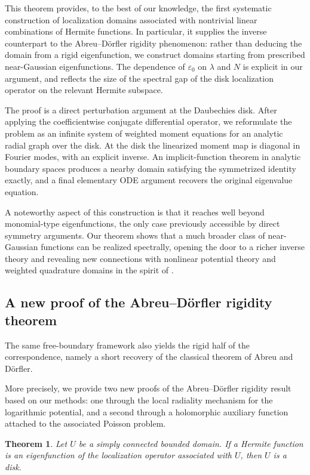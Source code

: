 \documentclass[a4paper,11pt,reqno]{amsart}
\numberwithin{equation}{section}
\theoremstyle{plain} %
\newtheorem{theorem}{Theorem}
\theoremstyle{definition} %
\theoremstyle{remark}
\begin{document}
This theorem provides, to the best of our knowledge, the first systematic construction of localization domains associated with nontrivial linear combinations of Hermite functions. In particular, it supplies the inverse counterpart to the Abreu--D\"orfler rigidity phenomenon: rather than deducing the domain from a rigid eigenfunction, we construct domains starting from prescribed near-Gaussian eigenfunctions. The dependence of $\varepsilon_0$ on $\lambda$ and $N$ is explicit in our argument, and reflects the size of the spectral gap of the disk localization operator on the relevant Hermite subspace.

The proof is a direct perturbation argument at the Daubechies disk. After
applying the coefficientwise conjugate differential operator, we reformulate
the problem as an infinite system of weighted moment equations for an analytic
radial graph over the disk. At the disk the linearized moment map is diagonal
in Fourier modes, with an explicit inverse. An implicit-function theorem in
analytic boundary spaces produces a nearby domain satisfying the symmetrized
identity exactly, and a final elementary ODE argument recovers the original
eigenvalue equation.

A noteworthy aspect of this construction is that it reaches well beyond monomial-type eigenfunctions, the only case previously accessible by direct symmetry arguments. Our theorem shows that a much broader class of near-Gaussian functions can be realized spectrally, opening the door to a richer inverse theory and revealing new connections with nonlinear potential theory and weighted quadrature domains in the spirit of \cite{Gustafsson-Shahgholian,Shahgholian}.

\subsection{A new proof of the Abreu--D\"orfler rigidity theorem}

The same free-boundary framework also yields the rigid half of the correspondence, namely a short recovery of the classical theorem of Abreu and D\"orfler.

More precisely, we provide two new proofs of the Abreu--D\"orfler rigidity result based on our methods: one through the local radiality mechanism for the logarithmic potential, and a second through a holomorphic auxiliary function attached to the associated Poisson problem.

\begin{theorem}\label{thm:eig-loc-U}
Let $U$ be a simply connected bounded domain. If a Hermite function is an eigenfunction of the localization operator associated with $U$, then $U$ is a disk.
\end{theorem}
\end{document}
